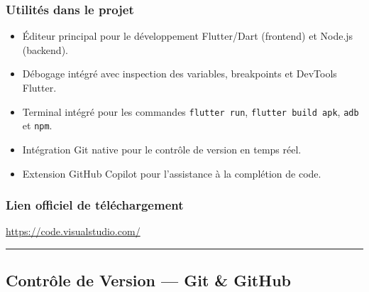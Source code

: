 \documentclass[12pt,a4paper]{report}
\begin{document}
\subsubsection*{Utilités dans le projet}
\begin{itemize}
  \item Éditeur principal pour le développement Flutter/Dart (frontend) et Node.js (backend).
  \item Débogage intégré avec inspection des variables, breakpoints et DevTools Flutter.
  \item Terminal intégré pour les commandes \texttt{flutter run}, \texttt{flutter build apk}, \texttt{adb} et \texttt{npm}.
  \item Intégration Git native pour le contrôle de version en temps réel.
  \item Extension GitHub Copilot pour l'assistance à la complétion de code.
\end{itemize}

\subsubsection*{Lien officiel de téléchargement}
\url{https://code.visualstudio.com/}

\medskip\hrule\medskip

\subsection{Contrôle de Version --- Git \& GitHub}
\end{document}

